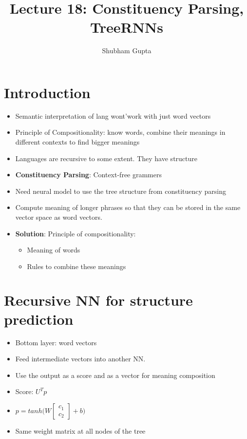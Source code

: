 \documentclass[a4paper]{article}
\title{Lecture 18: Constituency Parsing, TreeRNNs}
\author{Shubham Gupta}
\begin{document}
\maketitle
\section{Introduction}
\begin{itemize}
    \item Semantic interpretation of lang wont'work with just word vectors
    \item Principle of Compositionality: know words, combine their meanings in different contexts to find bigger meanings
    \item Languages are recursive to some extent. They have structure
    \item \textbf{Constituency Parsing}: Context-free grammers 
    \item Need neural model to use the tree structure from constituency parsing
    \item Compute meaning of longer phrases so that they can be stored in the same vector space as word vectors.
    \item \textbf{Solution}: Principle of compositionality:
    \begin{itemize}
        \item Meaning of words
        \item Rules to combine these meanings
    \end{itemize}
\end{itemize}
\section{Recursive NN for structure prediction}
\begin{itemize}
    \item Bottom layer: word vectors
    \item Feed intermediate vectors into another NN.
    \item Use the output as a score and as a vector for meaning composition
    \item Score: $U^Tp$
    \item $p = tanh\bigg(W\begin{bmatrix} c_1 \\ c_2 \end{bmatrix}  + b\bigg)$
    \item Same weight matrix at all nodes of the tree
\end{itemize}
\end{document}

